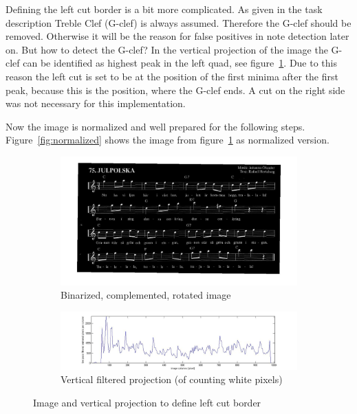 Defining the left cut border is a bit more complicated. 
As given in the task description  Treble Clef (G-clef) is always assumed. Therefore the G-clef should be removed. Otherwise it will be the reason for false positives in note detection later on. But how to detect the G-clef? In the vertical projection of the image the G-clef can be identified as highest peak in the left quad, see figure~\ref{fig:leftCut}. Due to this reason the left cut is set to be at the position of the first minima after the first peak, because this is the position, where the G-clef ends. A cut on the right side was not necessary for this implementation.

Now the image is normalized and well prepared for the following steps. Figure~\ref{fig:normalized} shows the image from figure~\ref{fig:leftCut} as normalized version.

\begin{figure}[htbp]
	\centering
    
  \begin{subfigure}[b]{0.81\textwidth}
        \hspace*{3mm}\includegraphics[width=\textwidth]{detectCut_lied.jpg}
        \caption{Binarized, complemented, rotated image}
  \end{subfigure}
  
  \begin{subfigure}[b]{0.9\textwidth}
        \includegraphics[width=\textwidth]{detectCut_plot.jpg}
        \caption{Vertical filtered projection (of counting white pixels)}
  \end{subfigure}
  	\caption{Image and vertical projection to define left cut border}
	\label{fig:leftCut}
  \end{figure}


